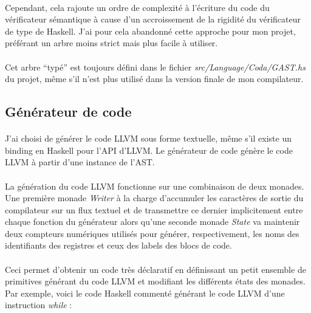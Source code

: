 \documentclass[a4paper]{article}
\begin{document}
    \paragraph{}Cependant, cela rajoute un ordre de complexité à l'écriture du
code du vérificateur sémantique à cause d'un accroissement de la rigidité du
vérificateur de type de Haskell. J'ai pour cela abandonné cette approche pour
mon projet, préférant un arbre moins strict mais plus facile à utiliser.

    \paragraph{}Cet arbre \enquote{typé} est toujours défini dans le fichier 
\textit{src/Language/Coda/GAST.hs} du projet, même s'il n'est plus utilisé dans
la version finale de mon compilateur.

  \subsection{Générateur de code}
  \label{codegen}

    \paragraph{}J'ai choisi de générer le code LLVM sous forme textuelle, même
s'il existe un binding en Haskell pour l'API d'LLVM. Le générateur de code
génère le code LLVM à partir d'une instance de l'AST.

    \paragraph{}La génération du code LLVM fonctionne sur une combinaison de
deux monades. Une première monade \textit{Writer} à la charge d'accumuler les
caractères de sortie du compilateur sur un flux textuel et de transmettre ce
dernier implicitement entre chaque fonction du générateur alors qu'une seconde
monade \textit{State} va maintenir deux compteurs numériques utilisés pour
générer, respectivement, les noms des identifiants des registres et ceux des
labels des blocs de code.

    \paragraph{}Ceci permet d'obtenir un code très déclaratif en définissant
un petit ensemble de primitives générant du code LLVM et modifiant les
différents états des monades.
    Par exemple, voici le code Haskell commenté générant le code LLVM d'une
instruction \textit{while} :
\end{document}
